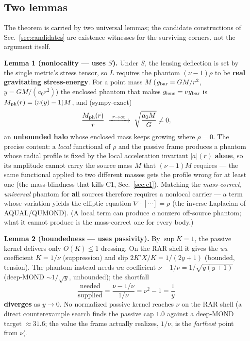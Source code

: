\documentclass[11pt]{article}
\newcommand{\gbar}{g_{\rm bar}}
\newcommand{\glens}{g_{\rm lens}}
\newcommand{\Mph}{M_{\rm ph}}
\begin{document}
\subsection{Two lemmas}\label{sec:lemmas}

The theorem is carried by two universal lemmas; the candidate constructions of Sec.~\ref{sec:candidates} are existence witnesses for the surviving corners, not the argument itself.

\textbf{Lemma 1 (nonlocality --- uses $S$).} Under $S$, the lensing deflection is set by the single metric's stress tensor, so $L$ requires the phantom $(\nu-1)\rho$ to be \textbf{real gravitating stress-energy}. For a point mass $M$ ($\gbar=GM/r^2$, $y=GM/(a_0r^2)$) the enclosed phantom that makes $\glens=\nu\gbar$ is $\Mph(r)=(\nu(y)-1)M$, and (sympy-exact)
\begin{equation}
\frac{\Mph(r)}{r}\;\xrightarrow{\ r\to\infty\ }\;\sqrt{\frac{a_0M}{G}}\neq0,
\end{equation}
an \textbf{unbounded halo} whose enclosed mass keeps growing where $\rho=0$. The precise content: a \emph{local} functional of $\rho$ and the passive frame produces a phantom whose radial profile is fixed by the local acceleration invariant $|a|(r)$ \textbf{alone}, so its amplitude cannot carry the source mass $M$ that $(\nu-1)M$ requires --- the same functional applied to two different masses gets the profile wrong for at least one (the mass-blindness that kills C1, Sec.~\ref{sec:c1}). Matching the \emph{mass-correct, universal} phantom for \textbf{all} sources therefore requires a nonlocal carrier --- a term whose variation yields the elliptic equation $\nabla\cdot[\cdots]=\rho$ (the inverse Laplacian of AQUAL/QUMOND). (A local term can produce \emph{a} nonzero off-source phantom; what it cannot produce is the mass-correct one for every body.)

\textbf{Lemma 2 (boundedness --- uses passivity).} By $\sup K=1$, the passive kernel delivers only $O(K)\le1$ dressing. On the RAR shell it gives the $uu$ coefficient $K=1/\nu$ (suppression) and slip $2K'X/K=1/(2y+1)$ (bounded, tension). The phantom instead needs $uu$ coefficient $\nu-1/\nu=1/\sqrt{y(y+1)}$ (deep-MOND ${\sim}1/\sqrt y$, unbounded); the shortfall
\begin{equation}
\frac{\text{needed}}{\text{supplied}}=\frac{\nu-1/\nu}{1/\nu}=\nu^2-1=\frac1y
\end{equation}
\textbf{diverges} as $y\to0$. No normalized passive kernel reaches $\nu$ on the RAR shell (a direct counterexample search finds the passive cap $1.0$ against a deep-MOND target ${\approx}31.6$; the value the frame actually realizes, $1/\nu$, is the \emph{farthest} point from $\nu$).
\end{document}
